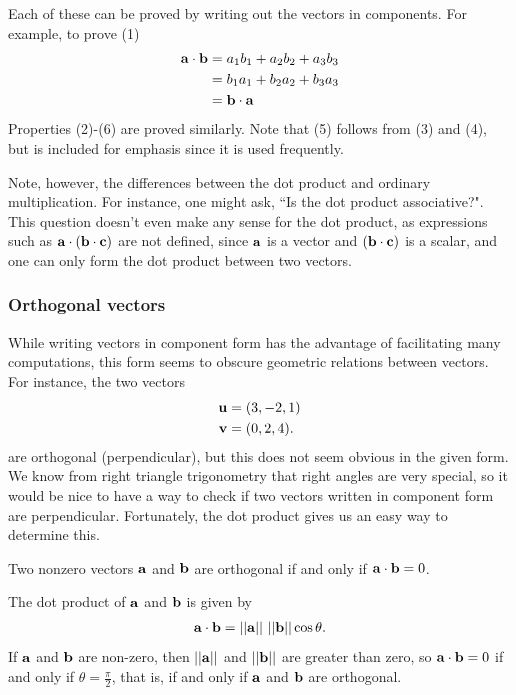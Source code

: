\documentclass[12pt,letterpaper,reqno]{article}
\numberwithin{equation}{section}
\newcommand{\fixme}[1]{{\color{orange}{[#1]}}}
\begin{document}
\begin{pf}
Each of these can be proved by writing out the vectors in components. For example, to prove (1)
\begin{align*}
	{\bf a}\cdot {\bf b}&=a_1b_1+a_2b_2+a_3b_3 \\
	&=b_1a_1+b_2a_2+b_3a_3 \\
	&={\bf b}\cdot {\bf a}
\end{align*}
Properties (2)-(6) are proved similarly. Note that (5) follows from (3) and (4), but is included for emphasis since it is used frequently. 	
\end{pf}

\fixme{Add exercises using these properties.}

Note, however, the differences between the dot product and ordinary multiplication. For instance, one might ask, ``Is the dot product associative?". This question doesn't even make any sense for the dot product, as expressions such as ${\bf a}\cdot ({\bf b}\cdot {\bf c})$ are not defined, since ${\bf a}$ is a vector and $({\bf b}\cdot {\bf c})$ is a scalar, and one can only form the dot product between two vectors. 

\subsubsection{Orthogonal vectors}
While writing vectors in component form has the advantage of facilitating many computations, this form seems to obscure geometric relations between vectors.
For instance, the two vectors
\begin{align*}
	{\bf u}&=(3,-2,1) \\
	{\bf v}&=(0,2,4).
\end{align*}
are orthogonal (perpendicular), but this does not seem obvious in the given form. We know from right triangle trigonometry that right angles are very special, so it would be nice to have a way to check if two vectors written in component form are perpendicular. Fortunately, the dot product gives us an easy way to determine this. 
\begin{prop}\label{prop:orthogonal_vectors}
	Two nonzero vectors ${\bf a}$ and ${\bf b}$ are orthogonal if and only if ${\bf a}\cdot {\bf b}=0$.
\end{prop}

\begin{pf}
	The dot product of ${\bf a}$ and ${\bf b}$ is given by
\begin{align*}
	{\bf a}\cdot {\bf b}=||{\bf a}|| \ ||{\bf b}||\cos \theta.
\end{align*}	
If ${\bf a}$ and ${\bf b}$ are non-zero, then $||{\bf a}||$ and $||{\bf b}||$ are greater than zero, so ${\bf a}\cdot {\bf b}=0$ if and only if $\theta=\frac{\pi}{2}$, that is, if and only if ${\bf a}$ and ${\bf b}$ are orthogonal. 
\end{pf}
\end{document}
